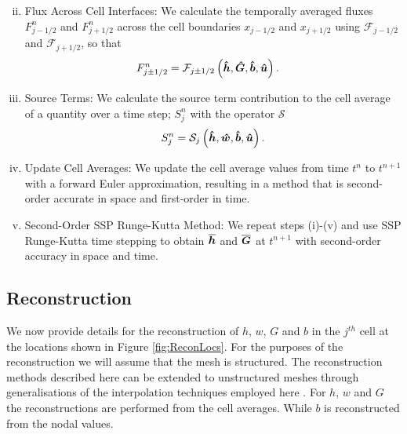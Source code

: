 \begin{enumerate}[(i)]
\begin{equation*}
	\end{equation*}
	\item Flux Across Cell Interfaces: We calculate the temporally averaged fluxes $F^n_{j-1/2}$ and $F^n_{j+1/2}$ across the cell boundaries $x_{j-1/2}$ and $x_{j+1/2}$ using $\mathcal{F}_{j-1/2}$ and $\mathcal{F}_{j+1/2}$, so that
		\begin{align*}	
		F^n_{j\pm 1/2} &=\mathcal{F}_{j\pm 1/2} \left( \boldsymbol{\hat{h}}, \boldsymbol{\hat{G}},\boldsymbol{\hat{b}}, \boldsymbol{\hat{u}}  \right).
		\end{align*}
	\item Source Terms: We calculate the source term contribution to the cell average of a quantity over a time step; $S^n_{j}$ with the operator $\mathcal{S}$
	\begin{equation*}	
	S^n_{j} =\mathcal{S}_{j} \left( \boldsymbol{\hat{h}},\boldsymbol{\hat{w}},\boldsymbol{\hat{b}}, \boldsymbol{\hat{u}}  \right).
	\end{equation*}
	\item Update Cell Averages: We update the cell average values from time $t^n$ to $t^{n+1}$ with a forward Euler approximation, resulting in a method that is second-order accurate in space and first-order in time.
	\item Second-Order SSP Runge-Kutta Method: We repeat steps (i)-(v) and use SSP Runge-Kutta time stepping to obtain $\overline{\boldsymbol{h}}$ and $\overline{\boldsymbol{G}}$ at $t^{n+1}$ with second-order accuracy in space and time.
\end{enumerate}


\subsection{Reconstruction}
\label{subsec:Reconstruction}
We now provide details for the reconstruction of $h$, $w$, $G$ and $b$ in the $j^{th}$ cell at the locations shown in Figure \ref{fig:ReconLocs}. For the purposes of the reconstruction we will assume that the mesh is structured. The reconstruction methods described here can be extended to unstructured meshes through generalisations of the interpolation techniques employed here \cite{Preneter-1975,atkinson-1978}. For $h$, $w$ and $G$ the reconstructions are performed from the cell averages. While $b$ is reconstructed from the nodal values. 

